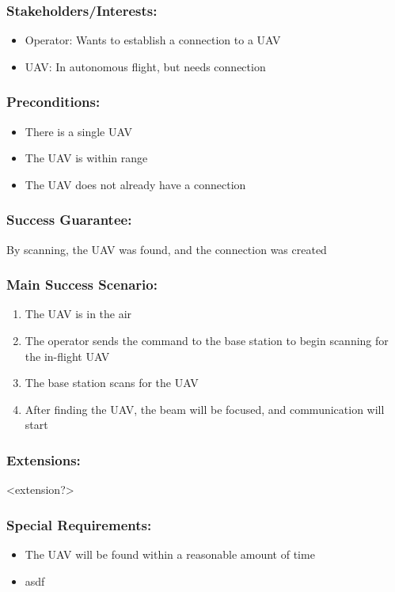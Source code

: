 \documentclass[ProductRequirements.tex]{subfiles}
\begin{document}
	\subsubsection*{Stakeholders/Interests:}
	\begin{itemize}\itemsep1pt
		\item Operator: Wants to establish a connection to a UAV
		\item UAV: In autonomous flight, but needs connection
	\end{itemize}
	\subsubsection*{Preconditions:}
	\begin{itemize}\itemsep1pt
		\item There is a single UAV
		\item The UAV is within range
		\item The UAV does not already have a connection
	\end{itemize}
	\subsubsection*{Success Guarantee:}
	By scanning, the UAV was found, and the connection was created
	\subsubsection*{Main Success Scenario:}
	\begin{enumerate}\itemsep1pt
		\item The UAV is in the air
		\item The operator sends the command to the base station to begin scanning for the in-flight UAV
		\item The base station scans for the UAV
		\item After finding the UAV, the beam will be focused, and communication will start
	\end{enumerate}
	\subsubsection*{Extensions:}
	<extension?>
	\subsubsection*{Special Requirements:}
	\begin{itemize}\itemsep1pt
		\item The UAV will be found within a reasonable amount of time
		\item asdf
	\end{itemize}
\end{document}
